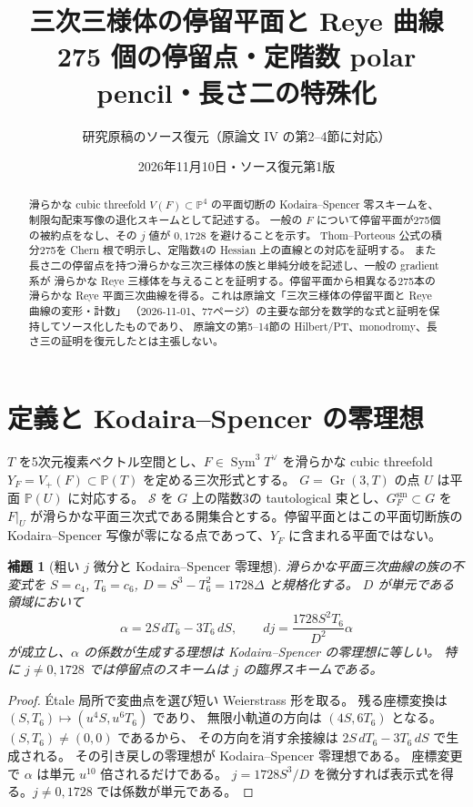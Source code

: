 \documentclass[11pt,a4paper]{ltjsarticle}
\title{三次三様体の停留平面と Reye 曲線\\\large 275 個の停留点・定階数 polar pencil・長さ二の特殊化}
\author{研究原稿のソース復元（原論文 IV の第2--4節に対応）}
\date{2026年11月10日・ソース復元第1版}
\newtheorem{lemma}[theorem]{補題}
\newcommand{\PP}{\mathbb P}
\newcommand{\Gr}{\operatorname{Gr}}
\newcommand{\Sym}{\operatorname{Sym}}
\newcommand{\cS}{\mathcal S}
\begin{document}
\maketitle
\begin{abstract}
滑らかな cubic threefold $V(F)\subset\PP^4$ の平面切断の
Kodaira--Spencer 零スキームを、制限勾配束写像の退化スキームとして記述する。
一般の $F$ について停留平面が275個の被約点をなし、その $j$ 値が $0,1728$ を避けることを示す。
Thom--Porteous 公式の積分275を Chern 根で明示し、定階数4の Hessian 上の直線との対応を証明する。
また長さ二の停留点を持つ滑らかな三次三様体の族と単純分岐を記述し、一般の gradient 系が
滑らかな Reye 三様体を与えることを証明する。停留平面から相異なる275本の滑らかな
Reye 平面三次曲線を得る。これは原論文「三次三様体の停留平面と Reye 曲線の変形・計数」
（2026-11-01、77ページ）の主要な部分を数学的な式と証明を保持してソース化したものであり、
原論文の第5--14節の Hilbert/PT、monodromy、長さ三の証明を復元したとは主張しない。
\end{abstract}
\tableofcontents

\section{定義と Kodaira--Spencer の零理想}
$T$ を5次元複素ベクトル空間とし、$F\in\Sym^3T^\vee$ を滑らかな cubic threefold
$Y_F=V_+(F)\subset\PP(T)$ を定める三次形式とする。
$G=\Gr(3,T)$ の点 $U$ は平面 $\PP(U)$ に対応する。
$\cS$ を $G$ 上の階数3の tautological 束とし、$G_F^{\mathrm{sm}}\subset G$ を
$F|_U$ が滑らかな平面三次式である開集合とする。停留平面とはこの平面切断族の
Kodaira--Spencer 写像が零になる点であって、$Y_F$ に含まれる平面ではない。

\begin{lemma}[粗い $j$ 微分と Kodaira--Spencer 零理想]\label{lem:j}
滑らかな平面三次曲線の族の不変式を $S=c_4$, $T_6=c_6$,
$D=S^3-T_6^2=1728\Delta$ と規格化する\cite[Theorem 4.4]{Fisher}。
$D$ が単元である領域において
\[
 \alpha=2S\,dT_6-3T_6\,dS,\qquad
 dj=\frac{1728S^2T_6}{D^2}\alpha
\]
が成立し、$\alpha$ の係数が生成する理想は Kodaira--Spencer の零理想に等しい。
特に $j\ne0,1728$ では停留点のスキームは $j$ の臨界スキームである。
\end{lemma}
\begin{proof}
\'{E}tale 局所で変曲点を選び短い Weierstrass 形を取る。
残る座標変換は $(S,T_6)\mapsto(u^4S,u^6T_6)$ であり、
無限小軌道の方向は $(4S,6T_6)$ となる。$(S,T_6)\ne(0,0)$ であるから、
その方向を消す余接線は $2S\,dT_6-3T_6\,dS$ で生成される。
その引き戻しの零理想が Kodaira--Spencer 零理想である。
座標変更で $\alpha$ は単元 $u^{10}$ 倍されるだけである。
$j=1728S^3/D$ を微分すれば表示式を得る。$j\ne0,1728$ では係数が単元である。
\end{proof}
\end{document}
